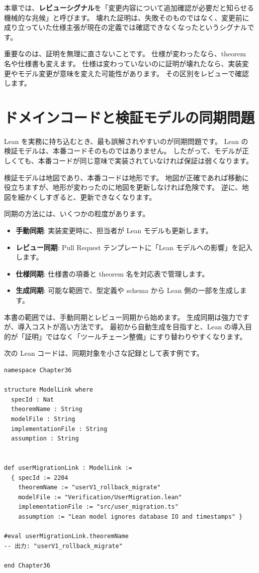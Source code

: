 本章では、\textbf{レビューシグナル}を「変更内容について追加確認が必要だと知らせる機械的な兆候」と呼びます。
壊れた証明は、失敗そのものではなく、変更前に成り立っていた仕様主張が現在の定義では確認できなくなったというシグナルです。

重要なのは、証明を無理に直さないことです。
仕様が変わったなら、theorem 名や仕様書も変えます。
仕様は変わっていないのに証明が壊れたなら、実装変更やモデル変更が意味を変えた可能性があります。
その区別をレビューで確認します。

\section{ドメインコードと検証モデルの同期問題}

Lean を実務に持ち込むとき、最も誤解されやすいのが同期問題です。
Lean の検証モデルは、本番コードそのものではありません。
したがって、モデルが正しくても、本番コードが同じ意味で実装されていなければ保証は弱くなります。

検証モデルは地図であり、本番コードは地形です。
地図が正確であれば移動に役立ちますが、地形が変わったのに地図を更新しなければ危険です。
逆に、地図を細かくしすぎると、更新できなくなります。

同期の方法には、いくつかの粒度があります。

\begin{itemize}
\item \textbf{手動同期}: 実装変更時に、担当者が Lean モデルも更新します。
\item \textbf{レビュー同期}: Pull Request テンプレートに「Lean モデルへの影響」を記入します。
\item \textbf{仕様同期}: 仕様書の項番と theorem 名を対応表で管理します。
\item \textbf{生成同期}: 可能な範囲で、型定義や schema から Lean 側の一部を生成します。
\end{itemize}

本書の範囲では、手動同期とレビュー同期から始めます。
生成同期は強力ですが、導入コストが高い方法です。
最初から自動生成を目指すと、Lean の導入目的が「証明」ではなく「ツールチェーン整備」にすり替わりやすくなります。

次の Lean コードは、同期対象を小さな記録として表す例です。

\begin{listing}[htbp]
\begin{verbatim}
namespace Chapter36

structure ModelLink where
  specId : Nat
  theoremName : String
  modelFile : String
  implementationFile : String
  assumption : String


def userMigrationLink : ModelLink :=
  { specId := 2204
    theoremName := "userV1_rollback_migrate"
    modelFile := "Verification/UserMigration.lean"
    implementationFile := "src/user_migration.ts"
    assumption := "Lean model ignores database IO and timestamps" }

#eval userMigrationLink.theoremName
-- 出力: "userV1_rollback_migrate"

end Chapter36
\end{verbatim}
\caption{\texttt{ModelLink}・\texttt{userMigrationLink}}
\label{lst:ch36-model-link}
\end{listing}

